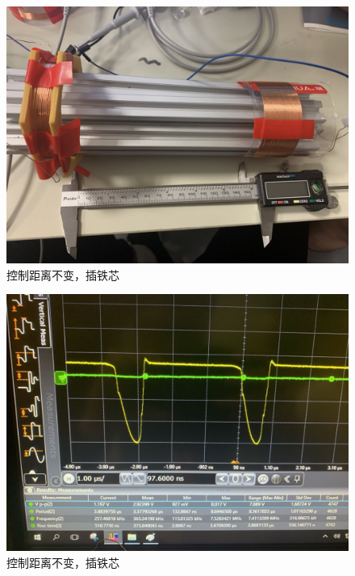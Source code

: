 \documentclass[conference]{IEEEtran}
\theoremstyle{break}
\begin{document}
\begin{figure}[htbp]
        \centerline{\includegraphics[scale=0.1]{频率2.png}}
        \caption{控制距离不变，插铁芯}
        \label{fig}
        \end{figure}

\begin{figure}[htbp]
        \centerline{\includegraphics[scale=0.1]{频率3.png}}
        \caption{控制距离不变，插铁芯}
        \label{fig}
        \end{figure}       
\end{document}
